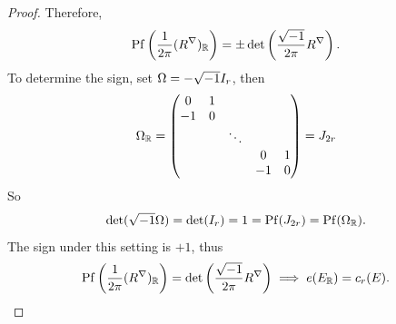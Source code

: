 \begin{proof}
    Therefore, 
    \begin{equation*}
        {\rm Pf}\left(\frac{1}{2\pi}(R^\nabla)_{\mathbb{R}}\right) = \pm\det\left(\frac{\sqrt{-1}}{2\pi}R^\nabla\right). 
    \end{equation*}
    To determine the sign, set $\Omega = -\sqrt{-1} I_r$, then 
    \begin{equation*}
        \Omega_{\mathbb{R}} = 
        \begin{pmatrix}
            0 & 1 & & & \\ 
            -1 & 0 & & & \\ 
             & & \ddots & & \\
             & & & 0 & 1 \\
             & & & -1 & 0 
        \end{pmatrix} = J_{2r}
    \end{equation*} 
    So 
    \begin{equation*}
        \det(\sqrt{-1}\Omega) = \det(I_r) = 1 = {\rm Pf}(J_{2r}) = {\rm Pf}(\Omega_{\mathbb{R}}).
    \end{equation*}
    The sign under this setting is $+1$, thus 
    \begin{equation*}
        {\rm Pf}\left(\frac{1}{2\pi}(R^\nabla)_{\mathbb{R}}\right) = \det\left(\frac{\sqrt{-1}}{2\pi}R^\nabla\right)
        \implies e(E_{\mathbb{R}}) = c_r(E). \qedhere
    \end{equation*}
\end{proof}

